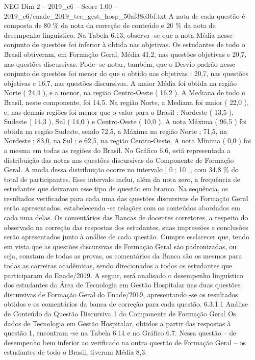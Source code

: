 \begin{textsample}{NEG Dim 2 – 2019\_c6 – Score 1.00 – 2019\_c6/enade\_2019\_tec\_gest\_hosp\_50af38c3bf.txt}
A nota de cada questão é composta de 80 \% da nota da correção de conteúdo e 20 \% da nota de desempenho linguístico.
Na Tabela 6.13, observa -se que a nota Média nesse conjunto de questões foi inferior à obtida nas objetivas.
Os estudantes de todo o Brasil obtiveram, em Formação Geral, Média 41,2, nas questões objetivas e 20,7, nas questões discursivas.
Pode -se notar, também, que o Desvio padrão nesse conjunto de questões foi menor do que o obtido nas objetivas : 20,7, nas questões objetivas e 16,7, nas questões discursivas.
A maior Média foi obtida na região Norte ( 24,4 ), e a menor, na região Centro-Oeste ( 16,2 ).
A Mediana de todo o Brasil, neste componente, foi 14,5.
Na região Norte, a Mediana foi maior ( 22,0 ), e, nas demais regiões foi menor que o valor para o Brasil : Nordeste ( 13,5 ), Sudeste ( 14,3 ), Sul ( 14,0 ) e Centro-Oeste ( 10,0 ).
A nota Máxima ( 96,5 ) foi obtida na região Sudeste, sendo 72,5, a Máxima na região Norte ; 71,5, na Nordeste ; 83,0, na Sul ; e 62,5, na região Centro-Oeste.
A nota Mínima ( 0,0 ) foi a mesma em todas as regiões do Brasil.
No Gráfico 6.6, está representada a distribuição das notas nas questões discursivas do Componente de Formação Geral.
A moda dessa distribuição ocorre no intervalo [ 0 ; 10 ], com 34,8 \% do total de participantes.
Esse intervalo inclui, além da nota zero, a frequência de estudantes que deixaram esse tipo de questão em branco.
Na sequência, os resultados verificados para cada uma das questões discursivas de Formação Geral serão apresentados, estabelecendo -se relações com os conteúdos abordados em cada uma delas.
Os comentários das Bancas de docentes corretores, a respeito do observado na correção das respostas dos estudantes, suas impressões e conclusões serão apresentados junto à análise de cada questão.
Cumpre esclarecer que, tendo em vista que as questões discursivas de Formação Geral são padronizadas, ou seja, constam de todas as provas, os comentários da Banca são os mesmos para todas as carreiras acadêmicas, sendo direcionados a todos os estudantes que participaram do Enade/2019.
A seguir, será analisado o desempenho linguístico dos estudantes da Área de Tecnologia em Gestão Hospitalar nas duas questões discursivas de Formação Geral do Enade/2019, apresentando -se os resultados obtidos e os comentários da banca de correção para cada questão. 6.3.1.1 Análise de Conteúdo da Questão Discursiva 1 do Componente de Formação Geral Os dados de Tecnologia em Gestão Hospitalar, obtidos a partir das respostas à questão 1, encontram -se na Tabela 6.14 e no Gráfico 6.7.
Nessa questão – de desempenho bem inferior ao verificado na outra questão de Formação Geral – os estudantes de todo o Brasil, tiveram Média 8,3.

\end{textsample}
